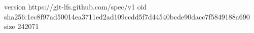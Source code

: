 version https://git-lfs.github.com/spec/v1
oid sha256:1ec8f97ad50014ea3711ed2ad109ccdd5f7d44540bcde90dacc7f5849188a690
size 242071
